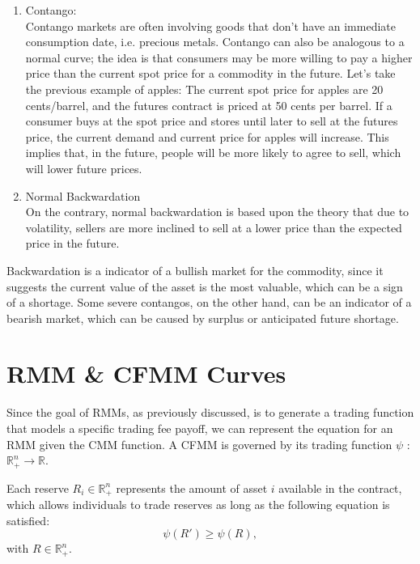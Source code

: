 \documentclass[12pt]{article}
\begin{document}
\begin{enumerate}
    \renewcommand{\labelenumi}{\alph{enumi}.}
    
    \item Contango: \\ 
    Contango markets are often involving goods that don't have an immediate consumption date, i.e. precious metals. Contango can also be analogous to a normal curve; the idea is that consumers may be more willing to pay a higher price than the current spot price for a commodity in the future. Let's take the previous example of apples: The current spot price for apples are 20 cents/barrel, and the futures contract is priced at 50 cents per barrel. If a consumer buys at the spot price and stores until later to sell at the futures price, the current demand and current price for apples will increase. This implies that, in the future, people will be more likely to agree to sell, which will lower future prices.
    \item Normal Backwardation \\
    On the contrary, normal backwardation is based upon the theory that due to volatility, sellers are more inclined to sell at a lower price than the expected price in the future. 
\end{enumerate}

Backwardation is a indicator of a bullish market for the commodity, since it suggests the current value of the asset is the most valuable, which can be a sign of a shortage. Some severe contangos, on the other hand, can be an indicator of a bearish market, which can be caused by surplus or anticipated future shortage.

\section{RMM \& CFMM Curves}
Since the goal of RMMs, as previously discussed, is to generate a trading function that models a specific trading fee payoff, we can represent the equation for an RMM given the CMM function. A CFMM is governed by its trading function \(\psi \) : \(\mathbb{R}^n_+ \to \mathbb{R}\).

Each reserve \( R_i \in \mathbb{R}^n_+ \) represents the amount of asset \(i\) available in the contract, which allows individuals to trade reserves as long as the following equation is satisfied: 
\[ \psi(R') \geq \psi(R), 
    \] with \(R \in \mathbb{R}^n_+\).
\end{document}
